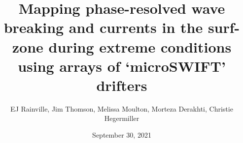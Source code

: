 \documentclass{article}
\begin{document}
\title{Mapping phase-resolved wave breaking and currents in the surf-zone during extreme conditions using arrays of ‘microSWIFT’ drifters}
\author{EJ Rainville, Jim Thomson, Melissa Moulton, Morteza Derakhti, Christie Hegermiller	}
\date{September 30, 2021}
\maketitle













\printbibliography
\end{document}
